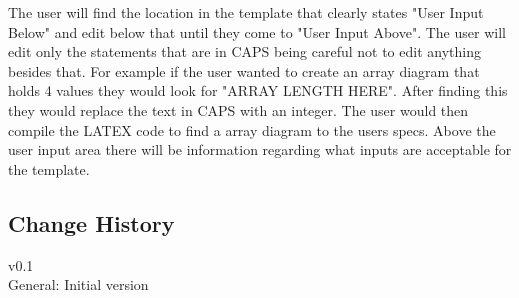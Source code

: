 \documentclass[10pt,a4paper,english]{article}
\begin{document}
The user will find the location in the template that clearly states "User Input Below" and edit below that until they come to "User Input Above".  The user will edit only the statements that are in CAPS being careful not to edit anything besides that.  For example if the user wanted to create an array diagram that holds 4 values they would look for "ARRAY LENGTH HERE".  After finding this they would replace the text in CAPS with an integer.  The user would then compile the LATEX code to find a array diagram to the users specs.  Above the user input area there will be information regarding what inputs are acceptable for the template. 



\newpage
\begin{multicols}{2} %

\section*{Change History}
v0.1\\
\indent General: Initial version 
\end{multicols}
\end{document}
